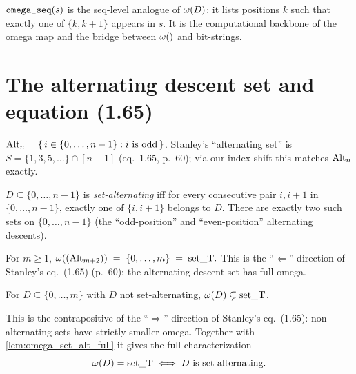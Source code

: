 \begin{definition}
  \label{def:omega_seq}
  \rocqok
  $\texttt{omega\_seq}(s)$ is the seq-level analogue of $\omega(D)$:
  it lists positions $k$ such that exactly one of $\{k, k+1\}$ appears
  in $s$.  It is the computational backbone of the omega map and the
  bridge between $\omegaSet$ and bit-strings.
\end{definition}

\section{The alternating descent set and equation (1.65)}

\begin{definition}
  \label{def:alt_desc_set}
  \rocqok
  $\mathrm{Alt}_n = \{\, i \in \{0, \dots, n-1\} : i \text{ is odd}\,\}$.
  Stanley's ``alternating set'' is
  $S = \{1, 3, 5, \dots\} \cap [n-1]$ (eq.~1.65, p.~60); via our
  index shift this matches $\mathrm{Alt}_n$ exactly.
\end{definition}

\begin{definition}
  \label{def:set_is_alt}
  \rocqok
  $D \subseteq \{0, \dots, n-1\}$ is \emph{set-alternating} iff for
  every consecutive pair $i, i+1$ in $\{0, \dots, n-1\}$, exactly one
  of $\{i, i+1\}$ belongs to $D$.  There are exactly two such sets on
  $\{0, \dots, n-1\}$ (the ``odd-position'' and ``even-position''
  alternating descents).
\end{definition}

\begin{lemma}
  \label{lem:omega_set_alt_full}
  \rocqok
  For $m \geq 1$,
  $\omega((\mathrm{Alt}_{m+2}))
   \;=\;
   \{0, \dots, m\}
   \;=\;
   \mathrm{set\_T}.$
  This is the ``$\Leftarrow$'' direction of Stanley's eq.~(1.65)
  (p.~60): the alternating descent set has full omega.
\end{lemma}

\begin{lemma}
  \label{lem:not_set_is_alt_omega_not_full}
  \rocqok
  For $D \subseteq \{0, \dots, m\}$ with $D$ not set-alternating,
  $\omega(D) \subsetneq \mathrm{set\_T}$.

  This is the contrapositive of the ``$\Rightarrow$'' direction of
  Stanley's eq.~(1.65): non-alternating sets have strictly smaller
  omega.  Together with \cref{lem:omega_set_alt_full} it gives the
  full characterization
  \[
    \omega(D) = \mathrm{set\_T}
    \;\Longleftrightarrow\;
    D \text{ is set-alternating}.
  \]
\end{lemma}
